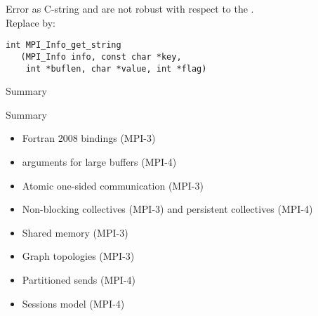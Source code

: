 \documentclass[10pt]{beamer}
\begin{document}
\begin{numberedframe}{Error as C-string}
  and 
 are not robust with respect to the  .\\
 Replace by:
\begin{lstlisting}
int MPI_Info_get_string
   (MPI_Info info, const char *key, 
    int *buflen, char *value, int *flag)  
\end{lstlisting}
\end{numberedframe}

 {Summary}

\begin{numberedframe}{Summary}
  \begin{itemize}
  \item Fortran 2008 bindings (MPI-3)
  \item {} arguments for large buffers (MPI-4)
  \item Atomic one-sided communication (MPI-3)
  \item Non-blocking collectives (MPI-3) and persistent collectives (MPI-4)
  \item Shared memory (MPI-3)
  \item Graph topologies (MPI-3)
  \item Partitioned sends (MPI-4)
  \item Sessions model (MPI-4)
  \end{itemize}
\end{numberedframe}


\begin{exerciseframe}[serialsend]
  \label{exserialsend}
  
\end{exerciseframe}

\begin{exerciseframe}[procgrid]
  
\end{exerciseframe}
\end{document}

